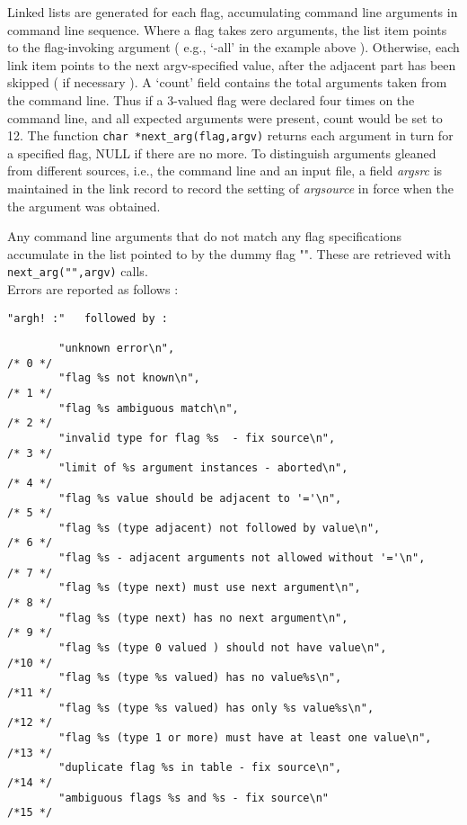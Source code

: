 Linked lists are generated for each flag, accumulating command line arguments
in command line sequence.  Where a flag takes zero arguments, the list item
points to the flag-invoking argument ( e.g., `-all' in the example above ).
Otherwise, each link item points to the next argv-specified value, after the
adjacent part has been skipped ( if necessary ).  A `count' field contains
the total arguments taken from the command line.  Thus if a 3-valued flag 
were declared four times on the command line, and all expected arguments were
present, count would be set to 12.  The function \verb+char *next_arg(flag,argv)+
returns each argument in turn for a specified flag, NULL if there are no more.
To distinguish arguments gleaned from different sources, i.e., the 
command line and an input file, a field {\em argsrc\/} is maintained in
the link record to record the setting of {\em argsource\/} in force 
when the the argument was obtained.

Any command line arguments that do not match any flag specifications accumulate
in the list pointed to by the dummy flag "".  These are retrieved with 
\verb+next_arg("",argv)+ calls.\\[2ex]

Errors are reported as follows :

\footnotesize
\begin{verbatim}
"argh! :"   followed by :

        "unknown error\n",                                              /* 0 */
        "flag %s not known\n",                                          /* 1 */
        "flag %s ambiguous match\n",                                    /* 2 */
        "invalid type for flag %s  - fix source\n",                     /* 3 */
        "limit of %s argument instances - aborted\n",                   /* 4 */
        "flag %s value should be adjacent to '='\n",                    /* 5 */
        "flag %s (type adjacent) not followed by value\n",              /* 6 */
        "flag %s - adjacent arguments not allowed without '='\n",       /* 7 */
        "flag %s (type next) must use next argument\n",                 /* 8 */
        "flag %s (type next) has no next argument\n",                   /* 9 */
        "flag %s (type 0 valued ) should not have value\n",             /*10 */
        "flag %s (type %s valued) has no value%s\n",                    /*11 */
        "flag %s (type %s valued) has only %s value%s\n",               /*12 */
        "flag %s (type 1 or more) must have at least one value\n",      /*13 */
        "duplicate flag %s in table - fix source\n",                    /*14 */
        "ambiguous flags %s and %s - fix source\n"                      /*15 */
\end{verbatim}
\normalsize

